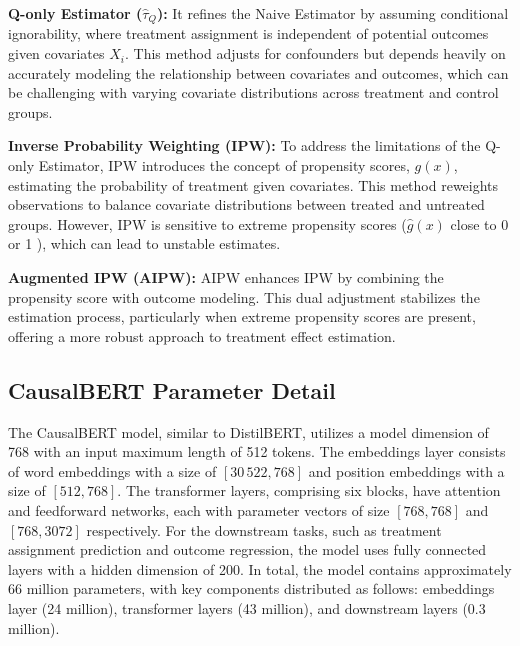\documentclass[11pt]{article}
\begin{document}
\textbf{Q-only Estimator (\(\hat{\tau}_{Q}\)):} It refines the Naive Estimator by assuming conditional ignorability, where treatment assignment is independent of potential outcomes given covariates \(X_i\). This method adjusts for confounders but depends heavily on accurately modeling the relationship between covariates and outcomes, which can be challenging with varying covariate distributions across treatment and control groups\cite{rubin2001using}.

\textbf{Inverse Probability Weighting (IPW):} To address the limitations of the Q-only Estimator, IPW introduces the concept of propensity scores, \(g(x)\), estimating the probability of treatment given covariates. This method reweights observations to balance covariate distributions between treated and untreated groups. However, IPW is sensitive to extreme propensity scores (\(\hat{g}(x)\) close to 0 or 1 ), which can lead to unstable estimates.

\textbf{Augmented IPW (AIPW):} AIPW enhances IPW by combining the propensity score with outcome modeling. This dual adjustment stabilizes the estimation process, particularly when extreme propensity scores are present, offering a more robust approach to treatment effect estimation.

\subsection{CausalBERT Parameter Detail}
\label{sec:causalbert_param}
The CausalBERT model, similar to DistilBERT, utilizes a model dimension of 768 with an input maximum length of 512 tokens. The embeddings layer consists of word embeddings with a size of \([30\,522, 768]\) and position embeddings with a size of \([512, 768]\). The transformer layers, comprising six blocks, have attention and feedforward networks, each with parameter vectors of size \([768, 768]\) and \([768, 3072]\) respectively. For the downstream tasks, such as treatment assignment prediction and outcome regression, the model uses fully connected layers with a hidden dimension of 200. In total, the model contains approximately 66 million parameters, with key components distributed as follows: embeddings layer (24 million), transformer layers (43 million), and downstream layers (0.3 million).
\end{document}
